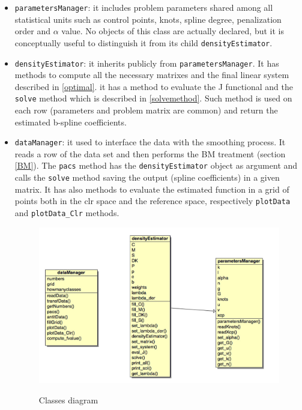 \begin{itemize}
\item \verb|parametersManager|: it includes problem parameters shared among all statistical units such as control points, knots, spline degree, penalization order and $\alpha$ value. No objects of this class are actually declared, but it is conceptually useful to distinguish it from its child \verb|densityEstimator|.

\item \verb|densityEstimator|: it inherits publicly from \verb|parametersManager|. It has methods to compute all the necessary matrixes and the final linear system described in \ref{optimal}. it has a method to evaluate the J functional and the \verb|solve| method which is described in \ref{solvemethod}. Such method is used on each row (parameters and problem matrix are common) and return the estimated b-spline coefficients.

\item \verb|dataManager|: it used to interface the data with the smoothing process. It reads a row of the data set and then performs the BM treatment (section \ref{BM}). The \verb|pacs| method has the \verb|densityEstimator| object as argument and calls the \verb|solve| method saving the output (spline coefficients) in a given matrix. It has also methods to evaluate the estimated function in a grid of points both in the clr space and the reference space, respectively \verb|plotData| and \verb|plotData_Clr| methods.

\begin{figure}[ht]
	
	
	\includegraphics[width=\textwidth]{./pictures/classes/class_diagram.jpg}
	\label{fig:diagram}

	\caption{Classes diagram}
	\label{fig:diagram}
	
\end{figure}

\end{itemize}

